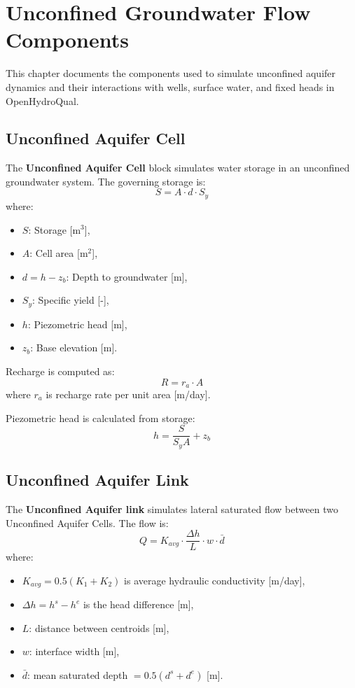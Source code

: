 \documentclass[12pt]{report}
\begin{document}
\chapter{Unconfined Groundwater Flow Components}

This chapter documents the components used to simulate unconfined aquifer dynamics and their interactions with wells, surface water, and fixed heads in OpenHydroQual.

\section{Unconfined Aquifer Cell}

The \textbf{Unconfined Aquifer Cell} block simulates water storage in an unconfined groundwater system. The governing storage is:
\begin{equation}
S = A \cdot d \cdot S_y
\end{equation}
where:
\begin{itemize}
\item $S$: Storage [m$^3$],
\item $A$: Cell area [m$^2$],
\item $d = h - z_b$: Depth to groundwater [m],
\item $S_y$: Specific yield [-],
\item $h$: Piezometric head [m],
\item $z_b$: Base elevation [m].
\end{itemize}

Recharge is computed as:
\begin{equation}
R = r_a \cdot A
\end{equation}
where $r_a$ is recharge rate per unit area [m/day].

Piezometric head is calculated from storage:
\begin{equation}
h = \frac{S}{S_y A} + z_b
\end{equation}

\section{Unconfined Aquifer Link}

The \textbf{Unconfined Aquifer link} simulates lateral saturated flow between two Unconfined Aquifer Cells. The flow is:
\begin{equation}
Q = K_{avg} \cdot \frac{\Delta h}{L} \cdot w \cdot \bar{d}
\end{equation}
where:
\begin{itemize}
\item $K_{avg} = 0.5(K_1 + K_2)$ is average hydraulic conductivity [m/day],
\item $\Delta h = h^s - h^e$ is the head difference [m],
\item $L$: distance between centroids [m],
\item $w$: interface width [m],
\item $\bar{d}$: mean saturated depth $= 0.5(d^s + d^e)$ [m].
\end{itemize}
\end{document}
